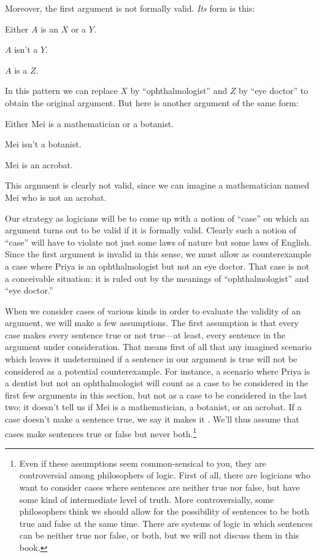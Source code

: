 Moreover, the first argument is not formally valid. \emph{Its} form is this:
\begin{earg}
	\item[] Either $A$ is an $X$ or a $Y$.
	\item[] $A$ isn't a $Y$.
	\item[\therefore] $A$ is a $Z$.
\end{earg}
In this pattern we can replace $X$ by ``ophthalmologist'' and $Z$ by ``eye doctor'' to obtain the original argument.  But here is another argument of the same form:
\begin{earg}
	\item[] Either Mei is a mathematician or a botanist.
	\item[] Mei isn't a botanist.
	\item[\therefore] Mei is an acrobat.
\end{earg}
This argmuent is clearly not valid, since we can imagine a mathematician named Mei who is not an acrobat.

Our strategy as logicians will be to come up with a notion of ``case'' on which an argument turns out to be valid if it is formally valid. Clearly such a notion of ``case'' will have to violate not just some laws of nature but some laws of English. Since the first argument is invalid in this sense, we must allow as counterexample a case where Priya is an ophthalmologist but not an eye doctor.  That case is not a conceivable situation: it is ruled out by the meanings of ``ophthalmologist'' and ``eye doctor.''

When we consider cases of various kinds in order to evaluate the validity of an argument, we will make a few assumptions. The first assumption is that every case makes every sentence true or not true---at least, every sentence in the argument under consideration. That means first of all that any imagined scenario which leaves it undetermined if a sentence in our argument is true will not be considered as a potential counterexample. For instance, a scenario where Priya is a dentist but not an ophthalmologist will count as a case to be considered in the first few arguments in this section, but not as a case to be considered in the last two: it doesn't tell us if Mei is a mathematician, a botanist, or an acrobat. If a case doesn't make a sentence true, we say it makes it . We'll thus assume that cases make sentences true or false but never both.\footnote{Even if these assumptions seem common-sensical to you, they are controversial among philosophers of logic. First of all, there are logicians who want to consider cases where sentences are neither true nor false, but have some kind of intermediate level of truth. More controversially, some philosophers think we should allow for the possibility of sentences to be both true and false at the same time. There are systems of logic in which sentences can be neither true nor false, or both, but we will not discuss them in this book.}


